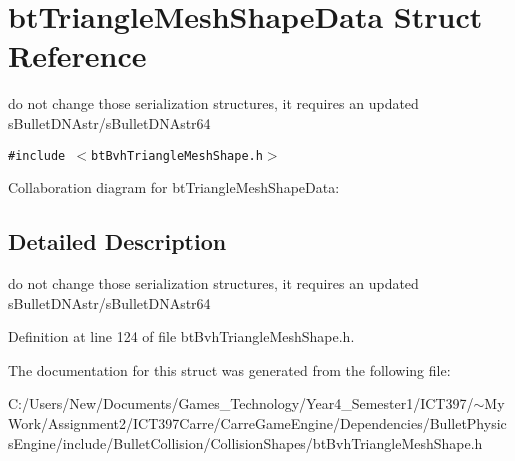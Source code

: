 \hypertarget{structbt_triangle_mesh_shape_data}{
\section{btTriangleMeshShapeData Struct Reference}
\label{structbt_triangle_mesh_shape_data}
}
do not change those serialization structures, it requires an updated sBulletDNAstr/sBulletDNAstr64  


{\tt \#include $<$btBvhTriangleMeshShape.h$>$}

Collaboration diagram for btTriangleMeshShapeData:

\subsection{Detailed Description}
do not change those serialization structures, it requires an updated sBulletDNAstr/sBulletDNAstr64 

Definition at line 124 of file btBvhTriangleMeshShape.h.

The documentation for this struct was generated from the following file:\begin{CompactItemize}
\item 
C:/Users/New/Documents/Games\_\-Technology/Year4\_\-Semester1/ICT397/$\sim$My Work/Assignment2/ICT397Carre/CarreGameEngine/Dependencies/BulletPhysicsEngine/include/BulletCollision/CollisionShapes/btBvhTriangleMeshShape.h\end{CompactItemize}
